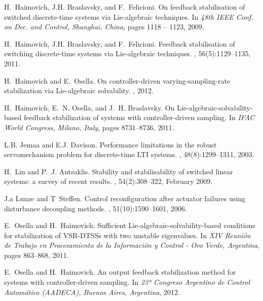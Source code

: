 \documentclass[letterpaper, 10 pt, conference]{ieeeconf}
\begin{document}
\begin{thebibliography}{10}
H.~Haimovich, J.H. Braslavsky, and F.~Felicioni.
\newblock On feedback stabilisation of switched discrete-time systems via
  {L}ie-algebraic techniques.
\newblock In {\em 48th IEEE Conf. on Dec. and Control, Shanghai, China}, pages
  1118 -- 1123, 2009.

H.~Haimovich, J.H. Braslavsky, and F.~Felicioni.
\newblock Feedback stabilisation of switching discrete-time systems via
  {L}ie-algebraic techniques.
, 56(5):1129--1135, 2011.

H.~Haimovich and E.~Osella.
\newblock On controller-driven varying-sampling-rate stabilization via
  {Lie}-algebraic solvability.
, 2012.

H.~Haimovich, E.~N. Osella, and J.~H. Braslavsky.
\newblock On {Lie}-algebraic-solvability-based feedback stabilization of
  systems with controller-driven sampling.
\newblock In {\em IFAC World Congress, Milano, Italy}, pages 8731--8736, 2011.

L.B. Jemaa and E.J. Davison.
\newblock Performance limitations in the robust servomechanism problem for
  discrete-time {LTI} systems.
, 48(8):1299--1311, 2003.

H.~Lin and P.~J. Antsaklis.
\newblock Stability and stabilisability of switched linear systems: a survey of
  recent results.
, 54(2):308--322, February
  2009.

J.a Lunze and T~Steffen.
\newblock Control reconfiguration after actuator failures using disturbance
  decoupling methods.
, 51(10):1590--1601,
  2006.

E.~Osella and H.~Haimovich.
\newblock Sufficient {Lie-algebraic-solvability-based} conditions for
  stabilization of {VSR-DTSSs} with two unstable eigenvalues.
\newblock In {\em XIV Reuni\'on de Trabajo en Procesamiento de la Informaci\'on
  y Control - Oro Verde, Argentina}, pages 863--868, 2011.

E.~Osella and H.~Haimovich.
\newblock An output feedback stabilization method for systems with
  controller-driven sampling.
\newblock In {\em 23º Congreso Argentino de Control {Automático} (AADECA),
  Buenos Aires, Argentina}, 2012.


\end{thebibliography}
\end{document}
